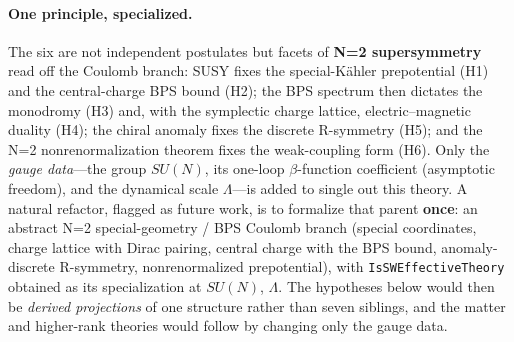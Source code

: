 \documentclass[11pt]{article}
\newcommand{\code}[1]{\texttt{#1}}
\begin{document}
\paragraph{One principle, specialized.} The six are not independent postulates but facets of
\textbf{N=2 supersymmetry} read off the Coulomb branch: SUSY fixes the special-K\"ahler prepotential
(H1) and the central-charge BPS bound (H2); the BPS spectrum then dictates the monodromy (H3) and,
with the symplectic charge lattice, electric--magnetic duality (H4); the chiral anomaly fixes the
discrete R-symmetry (H5); and the N=2 nonrenormalization theorem fixes the weak-coupling form (H6).
Only the \emph{gauge data}---the group $SU(N)$, its one-loop $\beta$-function coefficient (asymptotic
freedom), and the dynamical scale $\Lambda$---is added to single out this theory. A natural refactor,
flagged as future work, is to formalize that parent \textbf{once}: an abstract N=2 special-geometry /
BPS Coulomb branch (special coordinates, charge lattice with Dirac pairing, central charge with the
BPS bound, anomaly-discrete R-symmetry, nonrenormalized prepotential), with \code{IsSWEffectiveTheory}
obtained as its specialization at $SU(N)$, $\Lambda$. The hypotheses below would then be \emph{derived
projections} of one structure rather than seven siblings, and the matter and higher-rank theories
would follow by changing only the gauge data.
\end{document}
